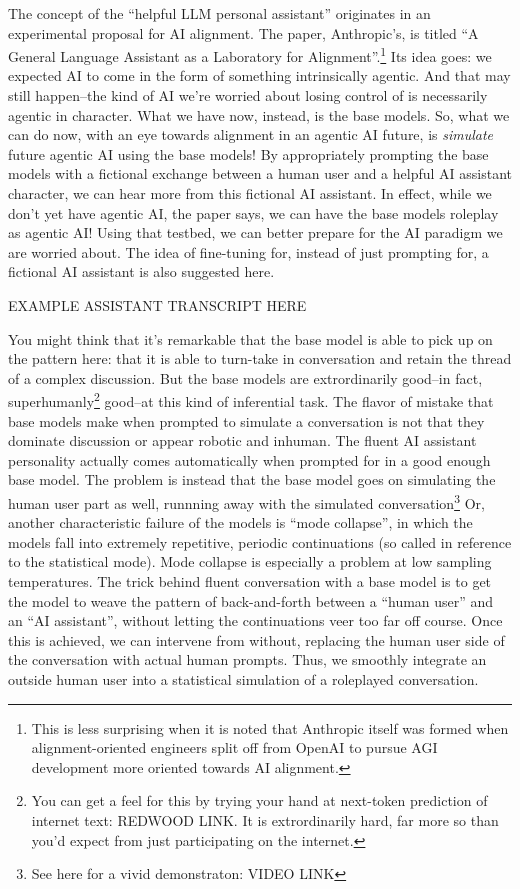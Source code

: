 The concept of the ``helpful LLM personal assistant'' originates in an
experimental proposal for AI alignment. The paper, Anthropic's, is titled ``A
General Language Assistant as a Laboratory for
Alignment''\cite{askell2021assistant}.\footnote{This is less surprising when it
is noted that Anthropic itself was formed when alignment-oriented engineers
split off from OpenAI to pursue AGI development more oriented towards AI
alignment.} Its idea goes: we expected AI to come in the form of something
intrinsically agentic. And that may still happen--the kind of AI we're worried
about losing control of is necessarily agentic in character. What we have now,
instead, is the base models. So, what we can do now, with an eye towards
alignment in an agentic AI future, is \emph{simulate} future agentic AI using
the base models! By appropriately prompting the base models with a fictional
exchange between a human user and a helpful AI assistant character, we can hear
more from this fictional AI assistant. In effect, while we don't yet have
agentic AI, the paper says, we can have the base models roleplay as agentic AI!
Using that testbed, we can better prepare for the AI paradigm we are worried
about. The idea of fine-tuning for, instead of just prompting for, a fictional
AI assistant is also suggested here.

EXAMPLE ASSISTANT TRANSCRIPT HERE

You might think that it's remarkable that the base model is able to pick up on
the pattern here: that it is able to turn-take in conversation and retain the
thread of a complex discussion. But the base models are extrordinarily good--in
fact, superhumanly\footnote{You can get a feel for this by trying your hand at
next-token prediction of internet text: REDWOOD LINK. It is extrordinarily
hard, far more so than you'd expect from just participating on the internet.}
good--at this kind of inferential task. The flavor of mistake that base models
make when prompted to simulate a conversation is not that they dominate
discussion or appear robotic and inhuman. The fluent AI assistant personality
actually comes automatically when prompted for in a good enough base model. The
problem is instead that the base model goes on simulating the human user part
as well, runnning away with the simulated conversation\footnote{See here for a
vivid demonstraton: VIDEO LINK} Or, another characteristic failure of the
models is ``mode collapse'', in which the models fall into extremely
repetitive, periodic continuations (so called in reference to the statistical
mode). Mode collapse is especially a problem at low sampling temperatures. The
trick behind fluent conversation with a base model is to get the model to weave
the pattern of back-and-forth between a ``human user'' and an ``AI assistant'',
without letting the continuations veer too far off course. Once this is
achieved, we can intervene from without, replacing the human user side of the
conversation with actual human prompts. Thus, we smoothly integrate an outside
human user into a statistical simulation of a roleplayed conversation.


